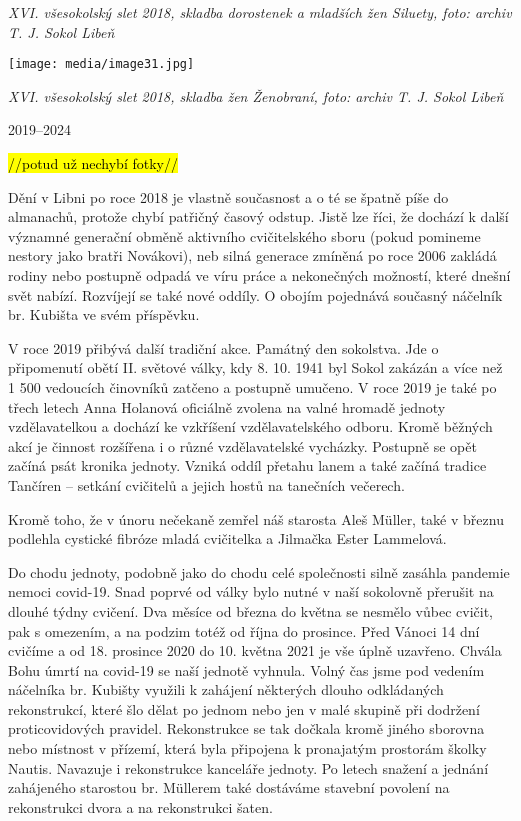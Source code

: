 \emph{XVI. všesokolský slet 2018, skladba dorostenek a mladších žen
Siluety, foto: archiv T. J. Sokol Libeň}

\texttt{[image: media/image31.jpg]}

\emph{XVI. všesokolský slet 2018, skladba žen Ženobraní, foto: archiv T.
J. Sokol Libeň}

2019--2024

\hl{//potud už nechybí fotky//}

Dění v Libni po roce 2018 je vlastně současnost a o té se špatně píše do
almanachů, protože chybí patřičný časový odstup. Jistě lze říci, že
dochází k další významné generační obměně aktivního cvičitelského sboru
(pokud pomineme nestory jako bratři Novákovi), neb silná generace
zmíněná po roce 2006 zakládá rodiny nebo postupně odpadá ve víru práce a
nekonečných možností, které dnešní svět nabízí. Rozvíjejí se také nové
oddíly. O obojím pojednává současný náčelník br. Kubišta ve svém
příspěvku.

V roce 2019 přibývá další tradiční akce. Památný den sokolstva. Jde o
připomenutí obětí II. světové války, kdy 8. 10. 1941 byl Sokol zakázán a
více než 1 500 vedoucích činovníků zatčeno a postupně umučeno. V roce
2019 je také po třech letech Anna Holanová oficiálně zvolena na valné
hromadě jednoty vzdělavatelkou a dochází ke vzkříšení vzdělavatelského
odboru. Kromě běžných akcí je činnost rozšířena i o různé vzdělavatelské
vycházky. Postupně se opět začíná psát kronika jednoty. Vzniká oddíl
přetahu lanem a také začíná tradice Tančíren -- setkání cvičitelů a
jejich hostů na tanečních večerech.

Kromě toho, že v únoru nečekaně zemřel náš starosta Aleš Müller, také v
březnu podlehla cystické fibróze mladá cvičitelka a Jilmačka Ester
Lammelová.

Do chodu jednoty, podobně jako do chodu celé společnosti silně zasáhla
pandemie nemoci covid-19. Snad poprvé od války bylo nutné v naší
sokolovně přerušit na dlouhé týdny cvičení. Dva měsíce od března do
května se nesmělo vůbec cvičit, pak s omezením, a na podzim totéž od
října do prosince. Před Vánoci 14 dní cvičíme a od 18. prosince 2020 do
10. května 2021 je vše úplně uzavřeno. Chvála Bohu úmrtí na covid-19 se
naší jednotě vyhnula. Volný čas jsme pod vedením náčelníka br. Kubišty
využili k zahájení některých dlouho odkládaných rekonstrukcí, které šlo
dělat po jednom nebo jen v malé skupině při dodržení proticovidových
pravidel. Rekonstrukce se tak dočkala kromě jiného sborovna nebo
místnost v přízemí, která byla připojena k pronajatým prostorám školky
Nautis. Navazuje i rekonstrukce kanceláře jednoty. Po letech snažení a
jednání zahájeného starostou br. Müllerem také dostáváme stavební
povolení na rekonstrukci dvora a na rekonstrukci šaten.

